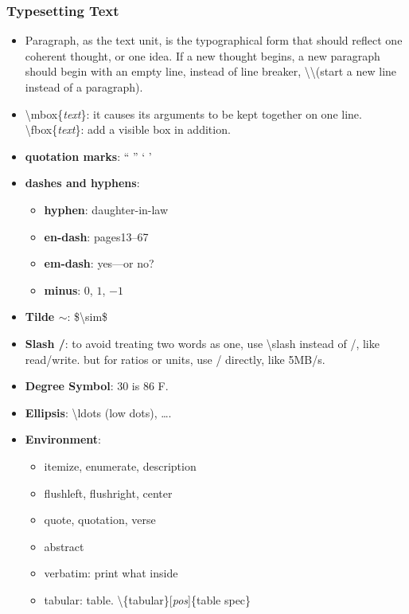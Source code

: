 \documentclass[11pt,twoside,a4paper]{article}
\begin{document}
\subsubsection{Typesetting Text} %
\begin{itemize}
  \item Paragraph, as the text unit, is the typographical form that should reflect one coherent thought, or one idea. If a new thought begins, a new paragraph should begin with an empty line, instead of line breaker, \textbackslash \textbackslash (start a new line instead of a paragraph).
  \item \textbackslash mbox\{\textit{text}\}: it causes its arguments to be kept together on one line. \textbackslash fbox\{\textit{text}\}: add a visible box in addition.
  \item \textbf{quotation marks}: `` '' ` '
  \item \textbf{dashes and hyphens}:
    \begin{itemize}
      \item \textbf{hyphen}: daughter-in-law
      \item \textbf{en-dash}: pages13--67
      \item \textbf{em-dash}: yes---or no?
      \item \textbf{minus}: $0$, $1$, $-1$
    \end{itemize}
  \item \textbf{Tilde $\sim$}: \$\textbackslash sim\$
  \item \textbf{Slash \slash}: to avoid treating two words as one, use \textbackslash slash instead of /, like read\slash write. but for ratios or units, use / directly, like 5MB/s.
  \item \textbf{Degree Symbol}: 30 \textcelsius{} is 86 \textdegree{}F.
  \item \textbf{Ellipsis}: \textbackslash ldots (low dots), \ldots.
  \item \textbf{Environment}:
    \begin{itemize}
      \item itemize, enumerate, description
      \item flushleft, flushright, center
      \item quote, quotation, verse
      \item abstract
      \item verbatim: print what inside
      \item tabular: table.  \textbackslash \{tabular\}[\textit{pos}]\{table spec\}
    \end{itemize}
\end{itemize}
\end{document}

